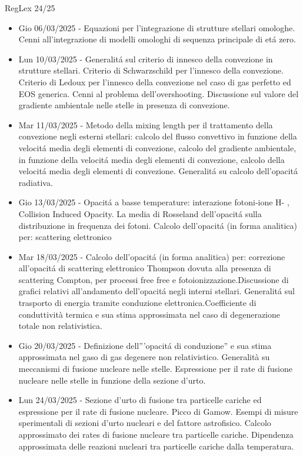 \begin{frame}{RegLex 24/25}
\begin{itemize}
\item Gio 06/03/2025 - Equazioni per l'integrazione di strutture stellari omologhe. Cenni all'integrazione di modelli omologhi di sequenza principale di et\'a zero.
\item Lun 10/03/2025 - Generalit\'a sul criterio di innesco della convezione in strutture stellari. Criterio di Schwarzschild per l'innesco della convezione. Criterio di Ledoux per l'innesco della convezione nel caso di gas perfetto ed EOS generica. Cenni al problema dell'overshooting. Discussione sul valore del gradiente ambientale nelle stelle in presenza di convezione.
\item Mar 11/03/2025 - Metodo della mixing length per il trattamento della convezione negli esterni stellari: calcolo del flusso convettivo in funzione della velocit\'a media degli elementi di convezione, calcolo del gradiente ambientale, in funzione della velocit\'a media degli elementi di convezione, calcolo della velocit\'a media degli elementi di convezione. Generalit\'a su calcolo dell'opacit\'a radiativa.
\item Gio 13/03/2025 - Opacit\'a a basse temperature: interazione fotoni-ione H- , Collision Induced Opacity. La media di Rosseland dell'opacit\'a sulla distribuzione in frequenza dei fotoni. Calcolo dell'opacit\'a (in forma analitica) per: scattering elettronico
\item Mar 18/03/2025 - Calcolo dell'opacit\'a (in forma analitica) per: correzione all'opacit\'a di scattering elettronico Thompson dovuta alla presenza di scattering Compton, per processi free free e fotoionizzazione.Discussione di grafici relativi all'andamento dell'opacit\'a negli interni stellari. Generalit\'a sul trasporto di energia tramite conduzione elettronica.Coefficiente di conduttività termica e sua stima approssimata nel caso di degenerazione totale non relativistica.
\item Gio 20/03/2025 - Definizione dell'''opacit\'a di conduzione'' e sua stima approssimata nel gaso di gas degenere non relativistico. Generalità su meccanismi di fusione nucleare nelle stelle. Espressione per il rate di fusione nucleare nelle stelle in funzione della sezione d'urto.
\item Lun 24/03/2025 - Sezione d'urto di fusione tra particelle cariche ed espressione per il rate di fusione nucleare. Picco di Gamow. Esempi di misure sperimentali di sezioni d'urto nucleari e del fattore astrofisico. Calcolo approssimato dei rates di fusione nucleare tra particelle cariche. Dipendenza approssimata delle reazioni nucleari tra particelle cariche dalla temperatura.

\end{itemize}
\end{frame}

